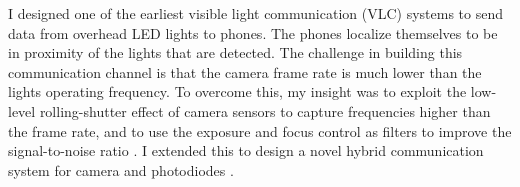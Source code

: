 \documentclass[10pt]{article}
\begin{document}
I designed one of the earliest visible light communication (VLC) systems to send data from overhead LED lights to phones. The phones localize themselves to be in proximity of the lights that are detected. The challenge in building this communication channel is that the camera frame rate is much lower than the lights operating frequency. 
To overcome this, my insight was to exploit the low-level rolling-shutter effect of camera sensors to capture frequencies higher than the frame rate, %
 and to use the exposure and focus control as filters to improve the signal-to-noise ratio \cite{rajagopal2014visual, rajagopal2014demonstration}. I extended this to design a novel hybrid communication system for camera and photodiodes \cite{rajagopal2014hybrid}. 
\end{document}
